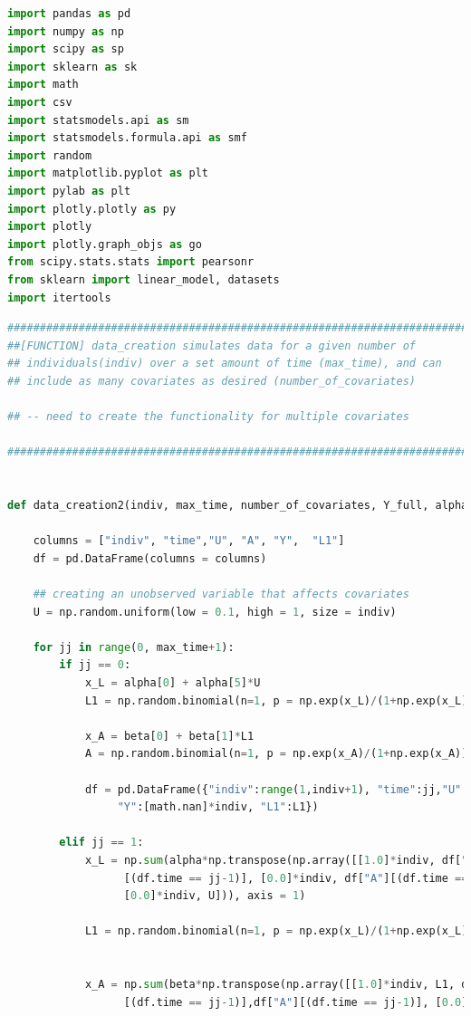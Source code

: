 \begin{lstlisting}[language=Python]
import pandas as pd
import numpy as np
import scipy as sp
import sklearn as sk
import math
import csv
import statsmodels.api as sm
import statsmodels.formula.api as smf
import random
import matplotlib.pyplot as plt
import pylab as plt
import plotly.plotly as py
import plotly
import plotly.graph_objs as go
from scipy.stats.stats import pearsonr   
from sklearn import linear_model, datasets
import itertools
\end{lstlisting}

\begin{lstlisting}[language=Python]
#########################################################################
##[FUNCTION] data_creation simulates data for a given number of 
## individuals(indiv) over a set amount of time (max_time), and can 
## include as many covariates as desired (number_of_covariates)

## -- need to create the functionality for multiple covariates

#########################################################################


def data_creation2(indiv, max_time, number_of_covariates, Y_full, alpha, beta): 

    columns = ["indiv", "time","U", "A", "Y",  "L1"]
    df = pd.DataFrame(columns = columns)
     
    ## creating an unobserved variable that affects covariates 
    U = np.random.uniform(low = 0.1, high = 1, size = indiv)
            
    for jj in range(0, max_time+1): 
        if jj == 0: 
            x_L = alpha[0] + alpha[5]*U 
            L1 = np.random.binomial(n=1, p = np.exp(x_L)/(1+np.exp(x_L)))

            x_A = beta[0] + beta[1]*L1 
            A = np.random.binomial(n=1, p = np.exp(x_A)/(1+np.exp(x_A)))

            df = pd.DataFrame({"indiv":range(1,indiv+1), "time":jj,"U":U, "A":A, \
                 "Y":[math.nan]*indiv, "L1":L1})
            
        elif jj == 1: 
            x_L = np.sum(alpha*np.transpose(np.array([[1.0]*indiv, df["L1"]\
                  [(df.time == jj-1)], [0.0]*indiv, df["A"][(df.time == jj-1)],\
                  [0.0]*indiv, U])), axis = 1)

            L1 = np.random.binomial(n=1, p = np.exp(x_L)/(1+np.exp(x_L)))


            x_A = np.sum(beta*np.transpose(np.array([[1.0]*indiv, L1, df["L1"]\
                  [(df.time == jj-1)],df["A"][(df.time == jj-1)], [0.0]*indiv ])), axis = 1)
                         

\end{lstlisting}
